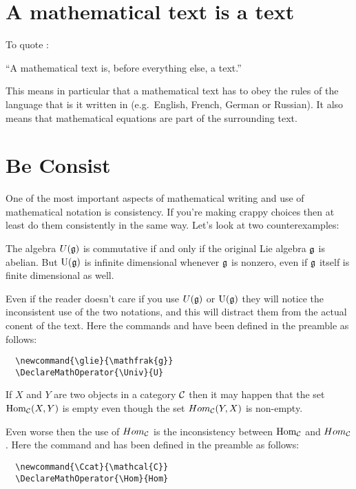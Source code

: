\documentclass[a4paper, 10pt, abstract=on, headings=standardclasses]{scrartcl}
\begin{document}
\section{A mathematical text is a text}
\label{a mathematical text is a text}

To quote \cite{mathoverflow_text}:

\begin{center}
  \enquote{A mathematical text is, before everything else, a text.}
\end{center}

This means in particular that a mathematical text has to obey the rules of the language that is it written in (e.g.\ English, French, German or Russian).
It also means that mathematical equations are part of the surrounding text.





\section{Be Consist}

One of the most important aspects of mathematical writing and use of mathematical notation is consistency.
If you’re making crappy choices then at least do them consistently in the same way.
Let’s look at two counterexamples:

\begin{LTXexample}[pos=b]
  The algebra $U(\glie)$ is commutative if and only if the original Lie algebra $\glie$ is abelian.
  But $\Univ(\glie)$ is infinite dimensional whenever $\glie$ is nonzero, even if $\glie$ itself is finite dimensional as well.
\end{LTXexample}
Even if the reader doesn’t care if you use $U(\glie)$ or $\Univ(\glie)$ they will notice the inconsistent use of the two notations, and this will distract them from the actual conent of the text.
Here the commands  and  have been defined in the preamble as follows:
\begin{lstlisting}
  \newcommand{\glie}{\mathfrak{g}}
  \DeclareMathOperator{\Univ}{U}
\end{lstlisting}

\begin{LTXexample}[pos=b]
If $X$ and $Y$ are two objects in a category $\Ccat$ then it may happen that the set $\Hom_{\Ccat}(X,Y)$ is empty even though the set $Hom_{\Ccat}(Y,X)$ is non-empty.
\end{LTXexample}
Even worse then the use of $Hom_{\Ccat}$ is the inconsistency between $\Hom_{\Ccat}$ and $Hom_{\Ccat}$.
Here the command  and  has been defined in the preamble as follows:
\begin{lstlisting}
  \newcommand{\Ccat}{\mathcal{C}}
  \DeclareMathOperator{\Hom}{Hom}
\end{lstlisting}
\end{document}
